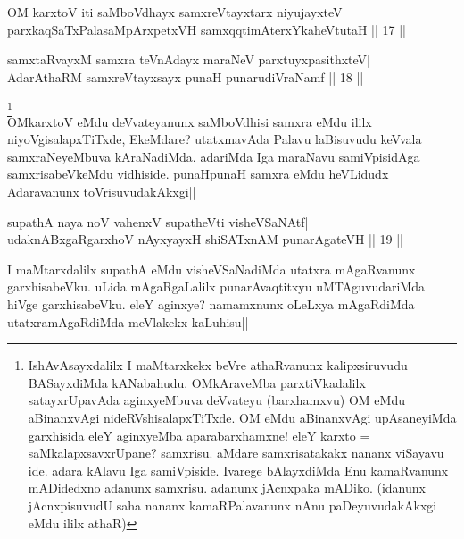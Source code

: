 \begin{shl}
OM karxtoV iti saMboVdhayx samxreVtayxtarx niyujayxteV| \\
parxkaqSaTxPalasaMpArxpetxVH samxqqtimAterxYkaheVtutaH \hfill||  17 || 
\end{shl}

\begin{shl}
samxtaRvayxM samxra teVnAdayx maraNeV parxtuyxpasithxteV| \\
AdarAthaRM samxreVtayxsayx punaH punarudiVraNamf \hfill||  18 || 
\end{shl}

\begin{artha} 
\footnote[1]{IshAvAsayxdalilx I maMtarxkekx beVre athaRvanunx 
kalipxsiruvudu BASayxdiMda kANabahudu. OMkAraveMba parxtiVkadalilx 
satayxrUpavAda aginxyeMbuva deVvateyu (barxhamxvu) OM eMdu aBinanxvAgi 
nideRVshisalapxTiTxde. OM eMdu aBinanxvAgi upAsaneyiMda garxhisida 
eleY aginxyeMba aparabarxhamxne! eleY karxto = saMkalapxsavxrUpane? 
samxrisu. aMdare samxrisatakakx nananx viSayavu ide. adara kAlavu Iga 
samiVpiside. Ivarege bAlayxdiMda Enu kamaRvanunx mADidedxno adanunx 
samxrisu. adanunx jAcnxpaka mADiko. (idanunx jAcnxpisuvudU saha nananx 
kamaRPalavanunx nAnu paDeyuvudakAkxgi eMdu ililx athaR)}\\
OMkarxtoV eMdu deVvateyanunx saMboVdhisi samxra eMdu ililx 
niyoVgisalapxTiTxde, EkeMdare? utatxmavAda Palavu laBisuvudu keVvala 
samxraNeyeMbuva kAraNadiMda. adariMda Iga maraNavu samiVpisidAga 
samxrisabeVkeMdu vidhiside. punaHpunaH samxra eMdu heVLidudx 
Adaravanunx toVrisuvudakAkxgi||
\end{artha}


\begin{shl}
supathA naya noV vahenxV supatheVti visheVSaNAtf| \\
udaknABxgaRgarxhoV nAyxyayxH shiSATxnAM punarAgateVH \hfill||  19 || 
\end{shl}

\begin{artha} 
I maMtarxdalilx supathA eMdu visheVSaNadiMda utatxra mAgaRvanunx 
garxhisabeVku. uLida mAgaRgaLalilx punarAvaqtitxyu uMTAguvudariMda 
hiVge garxhisabeVku. eleY aginxye? namamxnunx oLeLxya mAgaRdiMda 
utatxramAgaRdiMda meVlakekx kaLuhisu||
\end{artha}


